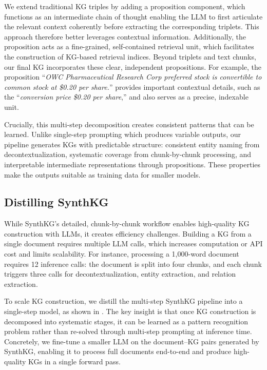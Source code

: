 \documentclass{article} %
\begin{document}
We extend traditional KG triples by adding a proposition component, which functions as an intermediate chain of thought \citep{wei2022chain} enabling the LLM to first articulate the relevant context coherently before extracting the corresponding triplets. This approach therefore better leverages contextual information. Additionally, the proposition acts as a fine-grained, self-contained retrieval unit, which facilitates the construction of KG-based retrieval indices. Beyond triplets and text chunks, our final KG incorporates these clear, independent propositions. For example, the proposition ``\textit{OWC Pharmaceutical Research Corp preferred stock is convertible to common stock at \$0.20 per share.}'' provides important contextual details, such as the ``\textit{conversion price \$0.20 per share},'' and also serves as a precise, indexable unit.

Crucially, this multi-step decomposition creates consistent patterns that can be learned. Unlike single-step prompting which produces variable outputs, our pipeline generates KGs with predictable structure: consistent entity naming from decontextualization, systematic coverage from chunk-by-chunk processing, and interpretable intermediate representations through propositions. These properties make the outputs suitable as training data for smaller models.

\subsection{Distilling SynthKG}
While SynthKG’s detailed, chunk-by-chunk workflow enables high-quality KG construction with LLMs, it creates efficiency challenges. Building a KG from a single document requires multiple LLM calls, which increases computation or API cost and limits scalability. For instance, processing a 1,000-word document requires 12 inference calls: the document is split into four chunks, and each chunk triggers three calls for decontextualization, entity extraction, and relation extraction.

To scale KG construction, we distill the multi-step SynthKG pipeline into a single-step model, as shown in . The key insight is that once KG construction is decomposed into systematic stages, it can be learned as a pattern recognition problem rather than re-solved through multi-step prompting at inference time. Concretely, we fine-tune a smaller LLM on the document–KG pairs generated by SynthKG, enabling it to process full documents end-to-end and produce high-quality KGs in a single forward pass.
\end{document}
